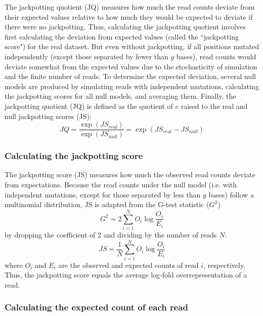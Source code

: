 \documentclass{article}
\begin{document}
The jackpotting quotient (JQ) measures how much the read counts deviate from their expected values relative to how much they would be expected to deviate if there were no jackpotting.
Thus, calculating the jackpotting quotient involves first calculating the deviation from expected values (called the ``jackpotting score") for the real dataset.
But even without jackpotting, if all positions mutated independently (except those separated by fewer than $g$ bases), read counts would deviate somewhat from the expected values due to the stochasticity of simulation and the finite number of reads.
To determine the expected deviation, several null models are produced by simulating reads with independent mutations, calculating the jackpotting scores for all null models, and averaging them.
Finally, the jackpotting quotient (JQ) is defined as the quotient of $e$ raised to the real and null jackpotting scores (JS):
\begin{equation}
    JQ = \frac{\exp{({JS}_{real})}}{\exp{({JS}_{null})}} = \exp{({JS}_{real} - {JS}_{null})}
\end{equation}

\subsubsection{Calculating the jackpotting score}
\label{calc-jackpotting-score}

The jackpotting score (JS) measures how much the observed read counts deviate from expectations.
Because the read counts under the null model (i.e. with independent mutations, except for those separated by less than $g$ bases) follow a multinomial distribution, JS is adapted from the G-test statistic ($G^2$)~\cite{Read1988}
\begin{equation}
    G^2 = 2\sum_{i=1}^N{O_i\log{\frac{O_i}{E_i}}}
\end{equation}
by dropping the coefficient of 2 and dividing by the number of reads $N$:
\begin{equation}
    JS = \frac{1}{N}\sum_{i=1}^N{O_i\log{\frac{O_i}{E_i}}}
\end{equation}
where $O_i$ and $E_i$ are the observed and expected counts of read $i$, respectively.
Thus, the jackpotting score equals the average log-fold overrepresentation of a read.

\subsubsection{Calculating the expected count of each read}
\label{calc-expected-count}
\end{document}
